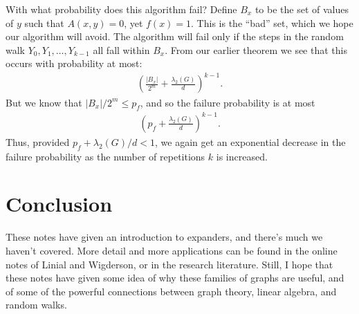 \documentclass[12pt]{article}
\begin{document}
With what probability does this algorithm fail? Define $B_x$ to be the
set of values of $y$ such that $A(x,y) = 0$, yet $f(x) = 1$.  This is
the ``bad'' set, which we hope our algorithm will avoid.  The
algorithm will fail only if the steps in the random walk
$Y_0,Y_1,\ldots,Y_{k-1}$ all fall within $B_x$.  From our earlier
theorem we see that this occurs with probability at most:
\begin{eqnarray}
  \left( \frac{|B_x|}{2^m} + \frac{\lambda_2(G)}{d} \right)^{k-1}.
\end{eqnarray}
But we know that $|B_x|/2^m \leq p_f$, and so the failure probability
is at most
\begin{eqnarray}
  \left( p_f + \frac{\lambda_2(G)}{d} \right)^{k-1}.
\end{eqnarray}
Thus, provided $p_f+\lambda_2(G)/d < 1$, we again get an exponential
decrease in the failure probability as the number of repetitions $k$
is increased.

\section{Conclusion}

These notes have given an introduction to expanders, and there's much
we haven't covered.  More detail and more applications can be found in
the online notes of Linial and Wigderson, or in the research
literature.  Still, I hope that these notes have given some idea of
why these families of graphs are useful, and of some of the powerful
connections between graph theory, linear algebra, and random walks.
\end{document}
